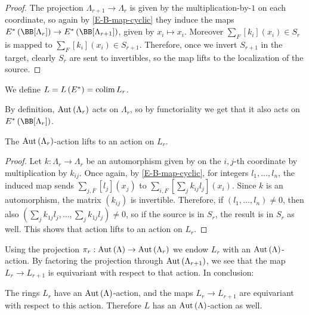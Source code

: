 \begin{proof}
	The projection $\Lambda_{r+1} \to \Lambda_r$ is given by the multiplication-by-$1$ on each coordinate, so again by \ref{E-B-map-cyclic} they induce the maps $E^*\left(\BB[\Lambda_r]\right) \to E^*\left(\BB[\Lambda_{r+1}]\right)$, given by $x_i \mapsto x_i$.
	Moreover $\sum_F [k_i]\left(x_i\right) \in S_r$ is mapped to $\sum_F [k_i]\left(x_i\right) \in S_{r+1}$.
	Therefore, once we invert $S_{r+1}$ in the target, clearly $S_r$ are sent to invertibles, so the map lifts to the localization of the source.
\end{proof}

\begin{definition}
	We define $L = L\left(E^*\right) = \operatorname{colim} L_r$.
\end{definition}

By definition, $\operatorname{Aut}\left(\Lambda_r\right)$ acts on $\Lambda_r$, so by functoriality we get that it also acts on $E^*\left(\BB[\Lambda_r]\right)$.

\begin{proposition}
	The $\operatorname{Aut}\left(\Lambda_r\right)$-action lifts to an action on $L_r$.
\end{proposition}

\begin{proof}
	Let $k: \Lambda_r \to \Lambda_r$ be an automorphism given by on the $i,j$-th coordinate by multiplication by $k_{ij}$.
	Once again, by \ref{E-B-map-cyclic}, for integers $l_1, \dotsc, l_n$, the induced map sends $\sum_{j,F} [l_j]\left(x_j\right)$ to $\sum_{i,F}\left[\sum_j k_{ij} l_j\right]\left(x_i\right)$.
	Since $k$ is an automorphism, the matrix $\left(k_{ij}\right)$ is invertible.
	Therefore, if $\left(l_1, \dotsc, l_n\right) \neq 0$, then also $\left(\sum_j k_{1j} l_j, \dotsc, \sum_j k_{1j} l_j\right) \neq 0$, so if the source is in $S_r$, the result is in $S_r$ as well.
	This shows that action lifts to an action on $L_r$.
\end{proof}

Using the projection $\pi_r: \operatorname{Aut}\left(\Lambda\right) \to \operatorname{Aut}\left(\Lambda_r\right)$ we endow $L_r$ with an $\operatorname{Aut}\left(\Lambda\right)$-action.
By factoring the projection through $\operatorname{Aut}\left(\Lambda_{r+1}\right)$, we see that the map $L_r \to L_{r+1}$ is equivariant with respect to that action.
In conclusion:

\begin{proposition}
	The rings $L_r$ have an $\operatorname{Aut}\left(\Lambda\right)$-action, and the maps $L_r \to L_{r+1}$ are equivariant with respect to this action.
	Therefore $L$ has an $\operatorname{Aut}\left(\Lambda\right)$-action as well.
\end{proposition}

